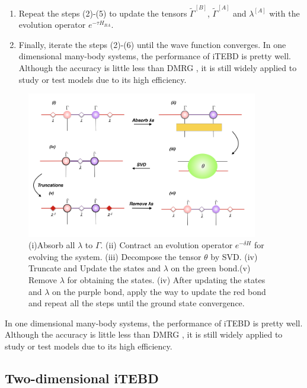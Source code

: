 \begin{enumerate}
		\item Repeat the steps (2)-(5) to update the tensors $\widetilde{\Gamma}^{[B]}$, $\widetilde{\Gamma}^{[A]}$ and $\lambda^{[A]}$ with the evolution operator $e^{-\tau H_{BA}}$.
		\item Finally, iterate the steps (2)-(6) until the wave function converges.
In one dimensional many-body systems, the performance of iTEBD is pretty well. Although the accuracy is little less than DMRG \cite{}, it is still widely applied to study or test models due to its high efficiency.
\end{enumerate}

\begin{figure}[ht][b]
	\centering
	\includegraphics[width=0.90\textwidth]{figures/fig313.png}
	\caption[The tensor network diagrams for the 1-D iTEBD]{ (i)Absorb all $\lambda$ to $\Gamma$. (ii) Contract an evolution operator $e^{-\delta H}$ for evolving the system. (iii) Decompose the tensor $\theta$ by SVD. (iv) Truncate and Update the states and $\lambda$ on the green bond.(v) Remove $
		\lambda$ for obtaining the states. (iv) After updating the states and $\lambda$ on the purple bond, apply the way to update the red bond and repeat all the steps until the ground state convergence.}
	\label{fig314}
\end{figure}


In one dimensional many-body systems, the performance of iTEBD is pretty well. Although the accuracy is little less than DMRG \cite{}, it is still widely applied to study or test models due to its high efficiency.

\subsection{Two-dimensional iTEBD}
\label{2ditebd}

